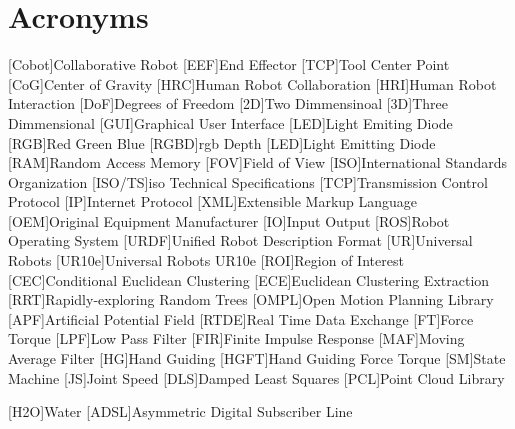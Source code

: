\chapter{Acronyms}

\footnotesize
\SingleSpacing

\begin{multicols}{2}
\begin{acronym}[AAAAAA]

    [Cobot]{Collaborative Robot}
    [EEF]{End Effector}
    [TCP]{Tool Center Point}
    [CoG]{Center of Gravity}
    [HRC]{Human Robot Collaboration}
    [HRI]{Human Robot Interaction}
    [DoF]{Degrees of Freedom}
    [2D]{Two Dimmensinoal}
    [3D]{Three Dimmensional}
    [GUI]{Graphical User Interface}
    [LED]{Light Emiting Diode}
    [RGB]{Red Green Blue}
    [RGBD]{\acs{rgb} Depth}
    [LED]{Light Emitting Diode}
    [RAM]{Random Access Memory}
    [FOV]{Field of View}
    [ISO]{International Standards Organization}
    [ISO/TS]{\acs{iso} Technical Specifications}
    [TCP]{Transmission Control Protocol}
    [IP]{Internet Protocol}
    [XML]{Extensible Markup Language}
    [OEM]{Original Equipment Manufacturer}
    [IO]{Input Output}
    [ROS]{Robot Operating System}
    [URDF]{Unified Robot Description Format}
    [UR]{Universal Robots}
    [UR10e]{Universal Robots UR10e}
    [ROI]{Region of Interest}
    [CEC]{Conditional Euclidean Clustering}
    [ECE]{Euclidean Clustering Extraction}
    [RRT]{Rapidly-exploring Random Trees}
    [OMPL]{Open Motion Planning Library}
    [APF]{Artificial Potential Field}
    [RTDE]{Real Time Data Exchange}
    [FT]{Force Torque}
    [LPF]{Low Pass Filter}
    [FIR]{Finite Impulse Response}
    [MAF]{Moving Average Filter}
    [HG]{Hand Guiding}
    [HGFT]{Hand Guiding Force Torque}
    [SM]{State Machine}
    [JS]{Joint Speed}
    [DLS]{Damped Least Squares}
    [PCL]{Point Cloud Library}

	[H2O]{Water}
	[ADSL]{Asymmetric Digital Subscriber Line}

\end{acronym}
\end{multicols}

